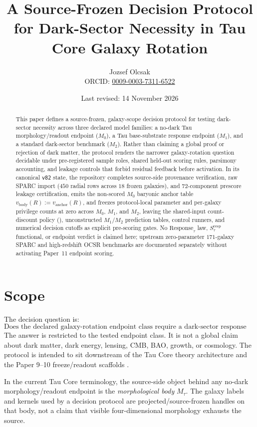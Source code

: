 \documentclass[11pt]{article}
\title{A Source-Frozen Decision Protocol for Dark-Sector Necessity in Tau Core Galaxy Rotation}
\author{Jozsef Olcsak\\{\small ORCID: \href{https://orcid.org/0009-0003-7311-6522}{0009-0003-7311-6522}}}
\date{Last revised: 14 November 2026}
\begin{document}
\maketitle

\begin{abstract}
This paper defines a source-frozen, galaxy-scope decision protocol for testing dark-sector necessity across three declared model families: a no-dark Tau morphology/readout endpoint ($M_0$), a Tau base-substrate response endpoint ($M_1$), and a standard dark-sector benchmark ($M_2$). Rather than claiming a global proof or rejection of dark matter, the protocol renders the narrower galaxy-rotation question decidable under pre-registered sample roles, shared held-out scoring rules, parsimony accounting, and leakage controls that forbid residual feedback before activation. In its canonical \texttt{v82} state, the repository completes source-side provenance verification, raw SPARC import ($450$ radial rows across $18$ frozen galaxies), and $72$-component prescore leakage certification, emits the non-scored $M_0$ baryonic anchor table $v_{\mathrm{body}}(R):=v_{\mathrm{anchor}}(R)$, and freezes protocol-local parameter and per-galaxy privilege counts at zero across $M_0$, $M_1$, and $M_2$, leaving the shared-input count-discount policy (), unconstructed $M_1/M_2$ prediction tables, control runners, and numerical decision cutoffs as explicit pre-scoring gates. No $\mathrm{Response}_{\tau}$ law, $S_{\tau}^{\mathrm{resp}}$ functional, or endpoint verdict is claimed here; upstream zero-parameter $171$-galaxy SPARC and high-redshift OCSR benchmarks are documented separately without activating Paper~11 endpoint scoring.
\end{abstract}

\section{Scope}

The decision question is:
\[
\text{Does the declared galaxy-rotation endpoint class require a dark-sector
response layer?}
\]
The answer is restricted to the tested endpoint class. It is not a global
claim about dark matter, dark energy, lensing, CMB, BAO, growth, or cosmology.
The protocol is intended to sit downstream of the Tau Core theory architecture
and the Paper 9--10 freeze/readout scaffolds
\cite{tauCoreTheoryHub2026,tauCorePaper9,tauCorePaper10}.

In the current Tau Core terminology, the source-side object behind any
no-dark morphology/readout endpoint is the \emph{morphological body}
\(M_\tau\).  The galaxy labels and kernels used by a decision protocol are
projected/source-frozen handles on that body, not a claim that visible
four-dimensional morphology exhausts the source.
\end{document}
